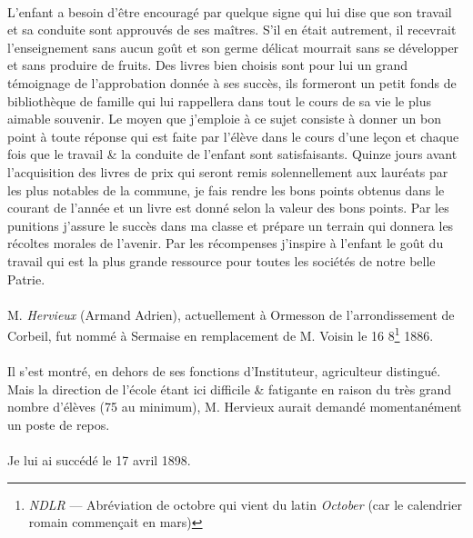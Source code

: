 \documentclass[../eBook.tex]{subfiles}
\begin{document}
{        \paragraph{}L'enfant a besoin d'être encouragé par quelque signe qui lui dise que son travail et sa conduite sont approuvés de ses maîtres. S'il en était autrement, il recevrait l'enseignement sans aucun goût et son germe délicat mourrait sans se développer et sans produire de fruits. Des livres bien choisis sont pour lui un grand témoignage de l'approbation donnée à ses succès, ils formeront un petit fonds de bibliothèque de famille qui lui rappellera dans tout le cours de sa vie le plus aimable souvenir. Le moyen que j'emploie à ce sujet consiste à donner un bon point à toute réponse qui est faite par l'élève dans le cours d'une leçon et chaque fois que le travail \& la conduite de l'enfant sont satisfaisants. Quinze jours avant l'acquisition des livres de prix qui seront remis solennellement aux lauréats par les plus notables de la commune, je fais rendre les bons points obtenus dans le courant de l'année et un livre est donné selon la valeur des bons points. Par les punitions j'assure le succès dans ma classe et prépare un terrain qui donnera les récoltes morales de l'avenir. Par les récompenses j'inspire à l'enfant le goût du travail qui est la plus grande ressource pour toutes les sociétés de notre belle Patrie.} \fg{}
        \paragraph{}M. \textit{Hervieux} (Armand Adrien), actuellement à Ormesson de l'arrondissement de Corbeil, fut nommé à Sermaise en remplacement de M. Voisin le 16 8\footnote{\textit{NDLR} --- Abréviation de octobre qui vient du latin \og \textit{October} \fg{} (car le calendrier romain commençait en mars)} 1886.
        \paragraph{}Il s'est montré, en dehors de ses fonctions d'Instituteur, agriculteur distingué. Mais la direction de l'école étant ici difficile \& fatigante en raison du très grand nombre d'élèves (75 au minimum), M. Hervieux aurait demandé momentanément un poste de repos.
        \paragraph{}Je lui ai succédé le 17 avril 1898.
\end{document}
